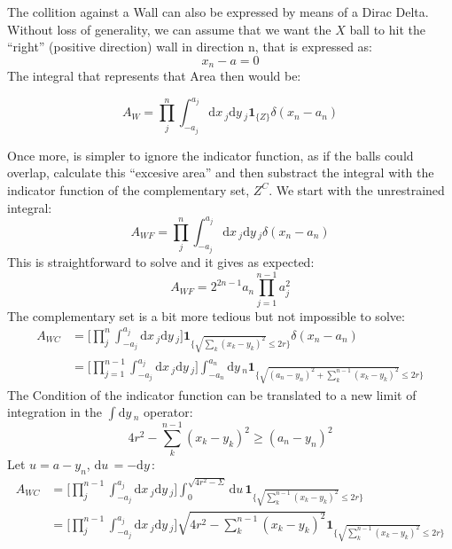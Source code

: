 \documentclass[superscriptaddress,pre,reprint,showpacs,onecolumn]{revtex4-1}
\newcommand{\rd}[1]{\mathrm{d}{#1} \,}
\newcommand{\indicatorsymbol}{\mathbf{1}}
\newcommand{\indicator}[1]{\indicatorsymbol_{ \{   #1 \} } }
\begin{document}
The collition against a Wall can also be expressed by means of a Dirac Delta.
Without loss of generality, we can assume that we want the $X$ ball to hit
the ``right'' (positive direction) wall in direction n, that is expressed
as:
\begin{equation}
x_n-a=0   
\end{equation}
The integral that represents that Area then would be:

\begin{equation}
  A_W=\prod_j^n \int_{-a_j}^{a_j} \rd x_j \rd y_j
  \indicator{Z} \delta(x_n-a_n)
\end{equation}

Once more, is simpler to ignore the indicator function, as if the
balls could overlap, calculate this ``excesive area'' and then substract
the integral with the indicator function of the complementary set, $Z^C$.
We start with the unrestrained integral:
\begin{equation}
  A_{WF}=\prod_j^n \int_{-a_j}^{a_j} \rd x_j \rd y_j \delta(x_n -a_n)
\end{equation}
This is straightforward to solve and it gives as expected:
\begin{equation}
  A_{WF}=2^{2n-1} a_n \prod_{j=1}^{n-1} a_j^2
\end{equation}
The complementary set is a bit more tedious but not impossible to solve:
\begin{equation}
  \begin{split}
  A_{WC} & =\Big[ \prod_j^n \int_{-a_j}^{a_j} \rd x_j \rd y_j \big]
  \indicator{\sqrt{\sum_k (x_k-y_k)^2 }\leq 2 r} \delta(x_n-a_n)  \\
  & = \Big[ \prod_{j=1}^{n-1} \int_{-a_j}^{a_j} \rd x_j \rd y_j \Big]
  \int_{-a_n}^{a_n} \rd y_n
  \indicator{\sqrt{(a_n - y_n)^2 +\sum_k^{n-1} (x_k-y_k)^2 }\leq 2 r}
  \end{split}
\end{equation}
  The Condition of the indicator function can be translated to a
  new limit of integration in the $\int \rd y_n$ operator:
  \begin{equation}
    4 r^2 -\sum_{k}^{n-1} (x_k - y_k) ^2 \geq ( a_n - y_n )^2
  \end{equation}
  Let $u = a - y_n $, $\rd u = -\rd y$:
  \begin{equation}
    \begin{split}
      A_{WC}& =
      \Big[ \prod_j^{n-1} \int_{-a_j}^{a_j} \rd x_j \rd y_j \big]
      \int_0^{\sqrt{4r^2-\Sigma}} \rd u
        \indicator{\sqrt{\sum_k^{n-1} (x_k -y_k)^2} \leq 2 r}\\ 
        & = \Big[ \prod_j^{n-1} \int_{-a_j}^{a_j} \rd x_j \rd y_j \Big]
        \sqrt{4 r^2 - \sum_k^{n-1} (x_k-y_k)^2}  
        \indicator{\sqrt{\sum_k^{n-1} (x_k -y_k)^2} \leq 2 r} 
    \end{split}
    \end{equation}
\end{document}

